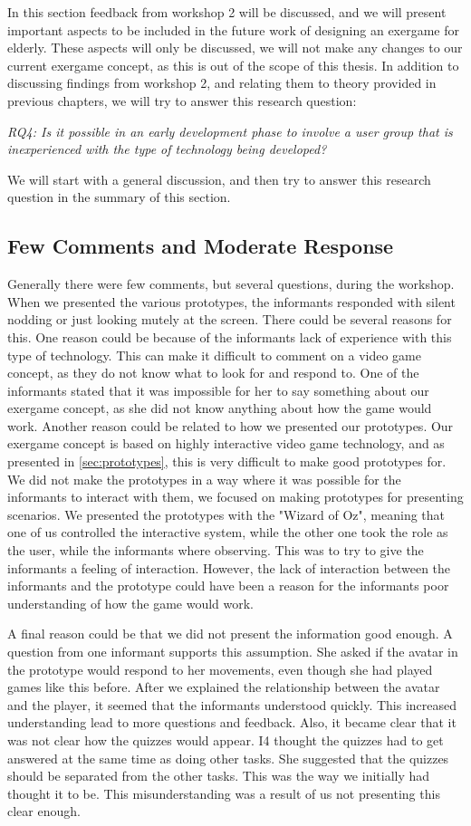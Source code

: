 In this section feedback from workshop 2 will be discussed, and we will present important aspects to be included in the future work of designing an exergame for elderly. These aspects will only be discussed, we will not make any changes to our current exergame concept, as this is out of the scope of this thesis. In addition to discussing findings from workshop 2, and relating them to theory provided in previous chapters, we will try to answer this research question:
 
\emph{RQ4: Is it possible in an early development phase to involve a user group that is inexperienced with the type of technology being developed?}

We will start with a general discussion, and then try to answer this research question in the summary of this section. 

\subsection{Few Comments and Moderate Response}
Generally there were few comments, but several questions, during the workshop. When we presented the various prototypes, the informants responded with silent nodding or just looking mutely at the screen. There could be several reasons for this. One reason could be because of the informants lack of experience with this type of technology. This can make it difficult to comment on a video game concept, as they do not know what to look for and respond to. One of the informants stated that it was impossible for her to say something about our exergame concept, as she did not know anything about how the game would work. Another reason could be related to how we presented our prototypes. Our exergame concept is based on highly interactive video game technology, and as presented in \ref{sec:prototypes}, this is very difficult to make good prototypes for. We did not make the prototypes in a way where it was possible for the informants to interact with them, we focused on making prototypes for presenting scenarios. We presented the prototypes with the "Wizard of Oz", meaning that one of us controlled the interactive system, while the other one took the role as the user, while the informants where observing. This was to try to give the informants a feeling of interaction. However, the lack of interaction between the informants and the prototype could have been a reason for the informants poor understanding of how the game would work. 

A final reason could be that we did not present the information good enough. A question from one informant supports this assumption. She asked if the avatar in the prototype would respond to her movements, even though she had played games like this before. After we explained the relationship between the avatar and the player, it seemed that the informants understood quickly. This increased understanding lead to more questions and feedback. Also, it became clear that it was not clear how the quizzes would appear. I4 thought the quizzes had to get answered at the same time as doing other tasks. She suggested that the quizzes should be separated from the other tasks. This was the way we initially had thought it to be. This misunderstanding was a result of us not presenting this clear enough.

